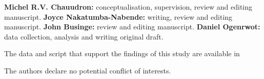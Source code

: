 \documentclass[AMA,Times1COL]{WileyNJDv5} %
\begin{document}
{}

\textbf{Michel R.V. Chauudron:} conceptualisation, supervision, review and editing manuscript. \textbf{Joyce Nakatumba-Nabende:} writing, review and editing manuscript.  \textbf{John Businge:} review and editing manuscript. \textbf{Daniel Ogenrwot:} data collection, analysis and writing original draft.

The data and script that support the findings of this study are available in 


The authors declare no potential conflict of interests.








\appendix

\end{document}
